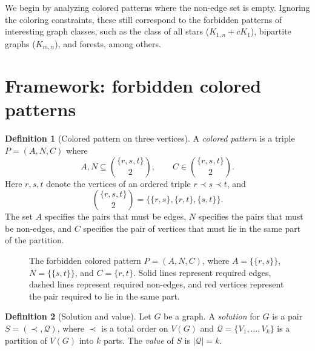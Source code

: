 \documentclass[11pt]{article}
\theoremstyle{definition}
\newtheorem{definition}{Definition}[section]
\theoremstyle{plain}
\theoremstyle{remark}
\begin{document}
We begin by analyzing colored patterns where the non-edge set is empty. Ignoring the coloring constraints, these still correspond to the forbidden patterns of interesting graph classes, such as the class of all stars ($K_{1,n} + cK_1$), bipartite graphs ($K_{m,n}$), and forests, among others.









\section{Framework: forbidden colored patterns}\label{sec:framework-patterns}

\begin{definition}[Colored pattern on three vertices]
A \emph{colored pattern} is a triple \(P=(A,N,C)\) where
\[
A,N \subseteq \binom{\{r,s,t\}}{2},
\qquad
C \in \binom{\{r,s,t\}}{2}.
\]
Here \(r,s,t\) denote the vertices of an ordered triple \(r\prec s\prec t\), and
\[
\binom{\{r,s,t\}}{2}=\{\{r,s\},\{r,t\},\{s,t\}\}.
\]
The set \(A\) specifies the pairs that must be edges, \(N\) specifies the pairs that must be non-edges,
and \(C\) specifies the pair of vertices that must lie in the same part of the partition.
\end{definition}


\begin{figure}[ht]
\centering
{}
\caption{The forbidden colored pattern \(P=(A,N,C)\), where \(A=\{\{r,s\}\}\), \(N=\{\{s,t\}\}\), and \(C=\{r,t\}\). Solid lines represent required edges, dashed lines represent required non-edges, and red vertices represent the pair required to lie in the same part.}
\label{fig:tiny-pattern}
\end{figure}





\begin{definition}[Solution and value]
Let \(G\) be a graph. A \emph{solution} for $G$ is a pair \(S=(\prec,\mathcal Q)\), where \(\prec\) is a total order on \(V(G)\)
and \(\mathcal Q=\{V_1,\dots,V_k\}\) is a partition of \(V(G)\) into \(k\) parts.
The \emph{value} of \(S\) is \(|\mathcal Q|=k\).
\end{definition}
\end{document}
